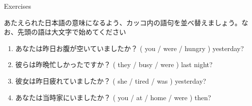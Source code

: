 \documentclass[aspectratio=169,xcolor={dvipsnames,table}]{beamer}
\newcommand{\myaudio}[1]{\href{#1}{\faVolumeUp}}
\begin{document}
\begin{frame}[plain]{Exercises}

{\small あたえられた日本語の意味になるよう、カッコ内の語句を並べ替えましょう。なお、先頭の語は大文字で始めてください}
 \begin{enumerate}
    \item {\small あなたは昨日お腹が空いていましたか？}
( you / were / hungry ) yesterday?\\
    \item {\small 彼らは昨晩忙しかったですか？}
( they / busy / were ) last night?\\
    \item {\small 彼女は昨日疲れていましたか？}
( she / tired / was ) yesterday?\\
    \item {\small あなたは当時家にいましたか？}
( you / at / home / were ) then?\\

 \end{enumerate}
\hfill{\scriptsize \myaudio{./audio/024_past_be_07.mp3}}

\end{frame}

\end{document}
